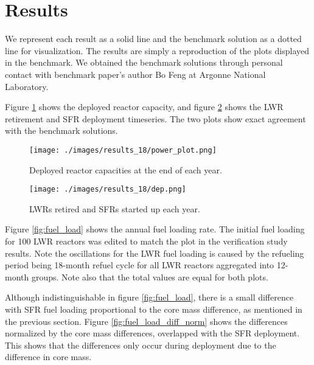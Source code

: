 \section{Results}

We represent each \Cyclus result as a solid line and the benchmark solution
as a dotted line for visualization. The results are
simply a reproduction of the plots displayed in the benchmark. 
We obtained the benchmark solutions through personal contact with
benchmark paper's author Bo Feng at Argonne National Laboratory.


Figure \ref{fig:pow_plot} shows the deployed reactor capacity, and
figure \ref{fig:dep} shows the \gls{LWR} retirement and \gls{SFR}
deployment timeseries. The two plots show exact agreement with the
benchmark solutions.

\begin{figure}[htbp!]
	\begin{center}
		\texttt{[image: ./images/results\_18/power\_plot.png]}
	\end{center}
        \caption{Deployed reactor capacities at the end of each year.}
	\label{fig:pow_plot}
\end{figure}



\begin{figure}[htbp!]
	\begin{center}
		\texttt{[image: ./images/results\_18/dep.png]}
	\end{center}
        \caption{\glspl{LWR} retired and \glspl{SFR} started up each year.}
	\label{fig:dep}
\end{figure}

Figure \ref{fig:fuel_load} shows the annual fuel loading rate.
The initial fuel loading for 100 \gls{LWR} reactors was edited to match
the plot in the verification
study results. Note the oscillations for the \gls{LWR} fuel loading
is caused by the refueling period being 18-month refuel cycle for all \gls{LWR} reactors
aggregated into 12-month groups. Note also that the total values
are equal for both plots.

Although indistinguishable in figure \ref{fig:fuel_load},
there is a small difference with \gls{SFR} fuel loading proportional
to the core mass difference, as mentioned in the previous section.
Figure \ref{fig:fuel_load_diff_norm} shows the
differences normalized by the core mass differences, overlapped with the
\gls{SFR} deployment. This shows that the differences only occur during
deployment due to the difference in core mass.


